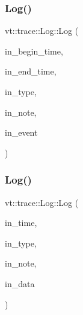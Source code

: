 \subsubsection{\texorpdfstring{Log()}{Log()}\hspace{0.1cm}{\footnotesize\ttfamily [4/11]}}
{\footnotesize\ttfamily vt\+::trace\+::\+Log\+::\+Log (\begin{DoxyParamCaption}\item[{\hyperlink{namespacevt_a2b9f28078dc309ad0706b69ded743e69}{Time\+Type} const}]{in\+\_\+begin\+\_\+time,  }\item[{\hyperlink{namespacevt_a2b9f28078dc309ad0706b69ded743e69}{Time\+Type} const}]{in\+\_\+end\+\_\+time,  }\item[{\hyperlink{namespacevt_1_1trace_acf454dfbd581b0ebae895f90b5927a1d}{Trace\+Constants\+Type} const}]{in\+\_\+type,  }\item[{std\+::string const \&}]{in\+\_\+note,  }\item[{\hyperlink{namespacevt_1_1trace_a64a7185f3e102df8d8258f263ccd1582}{Trace\+Event\+I\+D\+Type} const}]{in\+\_\+event }\end{DoxyParamCaption})\hspace{0.3cm}{\ttfamily [inline]}}

\mbox{\label{structvt_1_1trace_1_1_log_a3d0b33ca792eb0b06bae03b900487ec5}} 
\subsubsection{\texorpdfstring{Log()}{Log()}\hspace{0.1cm}{\footnotesize\ttfamily [5/11]}}
{\footnotesize\ttfamily vt\+::trace\+::\+Log\+::\+Log (\begin{DoxyParamCaption}\item[{\hyperlink{namespacevt_a2b9f28078dc309ad0706b69ded743e69}{Time\+Type} const}]{in\+\_\+time,  }\item[{\hyperlink{namespacevt_1_1trace_acf454dfbd581b0ebae895f90b5927a1d}{Trace\+Constants\+Type} const}]{in\+\_\+type,  }\item[{std\+::string const \&}]{in\+\_\+note,  }\item[{\hyperlink{structvt_1_1trace_1_1_log_af392c3825bf45d286a0f77bddf7a96cf}{User\+Data\+Type}}]{in\+\_\+data }\end{DoxyParamCaption})\hspace{0.3cm}{\ttfamily [inline]}}


